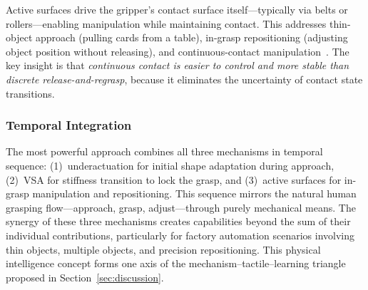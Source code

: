 Active surfaces drive the gripper's contact surface itself---typically via belts or rollers---enabling manipulation while maintaining contact. This addresses thin-object approach (pulling cards from a table), in-grasp repositioning (adjusting object position without releasing), and continuous-contact manipulation~\cite{kim2024lbh,wang2025belt}. The key insight is that \emph{continuous contact is easier to control and more stable than discrete release-and-regrasp}, because it eliminates the uncertainty of contact state transitions.

\subsubsection{Temporal Integration}

The most powerful approach combines all three mechanisms in temporal sequence: (1)~underactuation for initial shape adaptation during approach, (2)~VSA for stiffness transition to lock the grasp, and (3)~active surfaces for in-grasp manipulation and repositioning. This sequence mirrors the natural human grasping flow---approach, grasp, adjust---through purely mechanical means. The synergy of these three mechanisms creates capabilities beyond the sum of their individual contributions, particularly for factory automation scenarios involving thin objects, multiple objects, and precision repositioning. This physical intelligence concept forms one axis of the mechanism--tactile--learning triangle proposed in Section~\ref{sec:discussion}.
